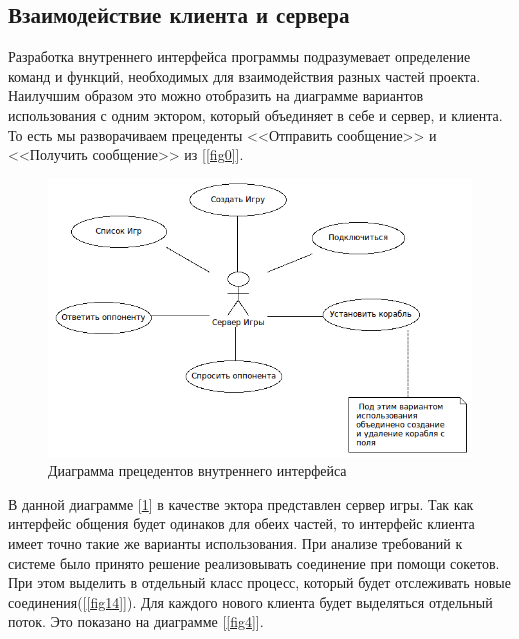 ﻿\subsection{Взаимодействие клиента и сервера}
  Разработка внутреннего интерфейса программы подразумевает определение команд и функций, необходимых для взаимодействия разных частей проекта. Наилучшим образом это можно отобразить на диаграмме вариантов использования с одним эктором, который объединяет в себе и сервер, и клиента. То есть мы разворачиваем прецеденты <<Отправить сообщение>> и <<Получить сообщение>> из [\ref{fig0}].  

\begin{figure}[ht]
\centering
\includegraphics[width=15cm]{images/interface.png}
\caption{Диаграмма прецедентов внутреннего интерфейса}
\label{fig3}
\end{figure}

В данной диаграмме [\ref{fig3}] в качестве эктора представлен сервер игры. Так как интерфейс общения будет одинаков для обеих частей, то интерфейс клиента имеет точно такие же варианты использования. При анализе требований к системе было принято решение реализовывать соединение при помощи сокетов. При этом выделить в отдельный класс процесс, который будет отслеживать новые соединения([\ref{fig14}]). Для каждого нового клиента будет выделяться отдельный поток. Это показано на диаграмме [\ref{fig4}].

